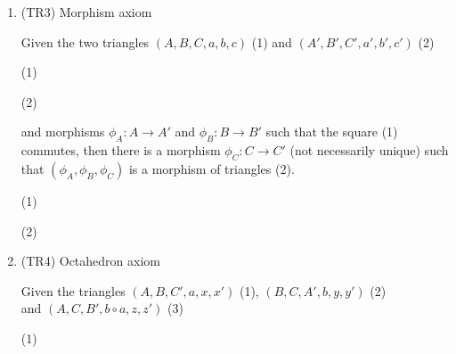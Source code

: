 \begin{definition}
\begin{enumerate}
\begin{center}
                \end{center}
            \item (TR3) Morphism axiom
            
                Given the two triangles $(A,B,C,a,b,c)$ (1) and $(A',B',C',a',b',c')$ (2)
                \begin{center}
                    (1)
                    (2) 
                \end{center}
                and morphisms $\phi_A : A \rightarrow A'$ and $\phi_B : B \rightarrow B'$ such that the square (1) commutes, then there is a morphism $\phi_C : C \rightarrow C'$ (not necessarily unique) such that $(\phi_A ,\phi_B ,\phi_C)$ is a morphism of triangles (2).
                
                \begin{center}
                    (1)
                    (2)
                \end{center}
            \item (TR4) Octahedron axiom
            
                Given the triangles $(A,B,C',a,x,x')$ (1), $(B,C,A',b,y,y')$ (2) \\ and $(A,C,B',b\circ a,z,z')$ (3)
                \begin{center}
                    (1)


\end{center}
\end{enumerate}
\end{definition}

